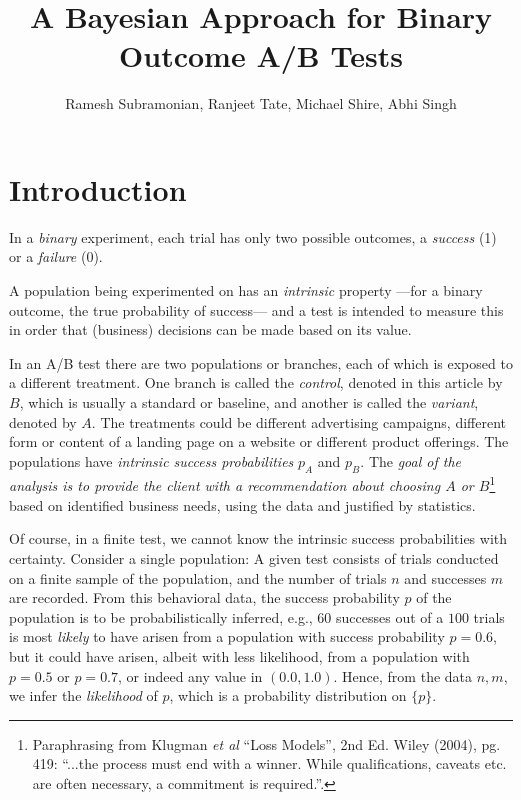 \documentclass[letterpaper,12pt]{article}
\begin{document}
\title{A Bayesian Approach for Binary Outcome A/B Tests}
\author{ Ramesh Subramonian, Ranjeet Tate, Michael Shire, Abhi Singh}
\maketitle
\thispagestyle{fancy}
\lhead{}
\chead{}
\rhead{}
\lfoot{}

\section{Introduction}
\label{sec:intro}

In a {\em binary} experiment, each trial has only two possible
outcomes, a {\em success} (1) or a {\em failure} (0).

A population being experimented on has an {\em intrinsic} property
---for a binary outcome, the true probability of success--- and a test
is intended to measure this in order that (business) decisions can be
made based on its value.

In an A/B test there are two populations or branches, each of which is
exposed to a different treatment. One branch is called the {\em
  control}, denoted in this article by \(B\), which is usually a
standard or baseline, and another is called the {\em variant}, denoted
by \(A\). The treatments could be different advertising campaigns,
different form or content of a landing page on a website or different
product offerings. The populations have {\em intrinsic success
  probabilities} \(p_A\) and \(p_B\). The {\em goal of the analysis is
  to provide the client with a recommendation about choosing \(A\) or
  \(B\)}\footnote{Paraphrasing from Klugman {\em et al} ``Loss
  Models'', 2nd Ed. Wiley (2004), pg. 419: ``...the process must end
  with a winner. While qualifications, caveats etc. are often
  necessary, a commitment is required.''.}  based on identified
business needs, using the data and justified by statistics.

Of course, in a finite test, we cannot know the intrinsic success
probabilities with certainty. Consider a single population: A given
test consists of trials conducted on a finite sample of the
population, and the number of trials \(n\) and successes \(m\) are
recorded. From this behavioral data, the success probability \(p\) of
the population is to be probabilistically inferred, e.g., \(60\)
successes out of a \(100\) trials is most {\em likely} to have arisen
from a population with success probability \(p=0.6\), but it could
have arisen, albeit with less likelihood, from a population with
\(p=0.5\) or \(p=0.7\), or indeed any value in \((0.0, 1.0)\). Hence,
from the data \(n,m\), we infer the {\em likelihood} of \(p\), which
is a probability distribution on \(\{p\}\).
\end{document}
